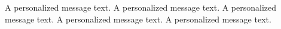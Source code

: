\documentclass{TMR}
\begin{document}
\begin{coverletter}

A personalized message text. 
A personalized message text. 
A personalized message text. 
A personalized message text. 
A personalized message text. 

\end{coverletter}
\end{document}
